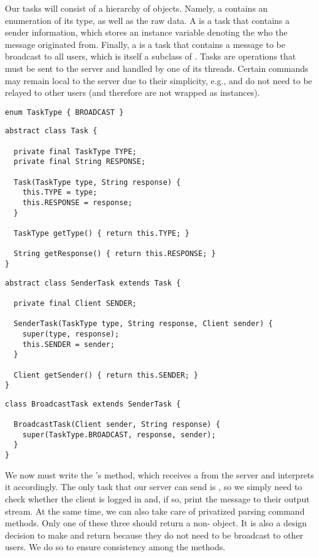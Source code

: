 Our tasks will consist of a hierarchy of objects. Namely, a  contains an enumeration of its type, as well as the raw data. A  is a task that contains a sender information, which stores an instance variable denoting the  who the message originated from. Finally, a  is a task that contains a message to be broadcast to all users, which is itself a subclass of . Tasks are operations that must be sent to the server and handled by one of its threads. Certain commands may remain local to the server due to their simplicity, e.g.,  and  do not need to be relayed to other users (and therefore are not wrapped as  instances). 

\begin{lstlisting}[language=MyJava]
enum TaskType { BROADCAST }
\end{lstlisting}

\begin{lstlisting}[language=MyJava]
abstract class Task {

  private final TaskType TYPE;
  private final String RESPONSE;

  Task(TaskType type, String response) {
    this.TYPE = type;
    this.RESPONSE = response;
  }

  TaskType getType() { return this.TYPE; }

  String getResponse() { return this.RESPONSE; }
}
\end{lstlisting}

\begin{lstlisting}[language=MyJava]
abstract class SenderTask extends Task {

  private final Client SENDER;

  SenderTask(TaskType type, String response, Client sender) {
    super(type, response);
    this.SENDER = sender;
  }

  Client getSender() { return this.SENDER; }
}
\end{lstlisting}

\begin{lstlisting}[language=MyJava]
class BroadcastTask extends SenderTask {

  BroadcastTask(Client sender, String response) {
    super(TaskType.BROADCAST, response, sender);
  }
}
\end{lstlisting}

We now must write the 's  method, which receives a  from the server and interprets it accordingly. The only task that our server can send is , so we simply need to check whether the client is logged in and, if so, print the message to their output stream. At the same time, we can also take care of privatized parsing command methods. Only one of these three should return a non- object. It is also a design decision to make  and  return  because they do not need to be broadcast to other users. We do so to ensure consistency among the methods.

